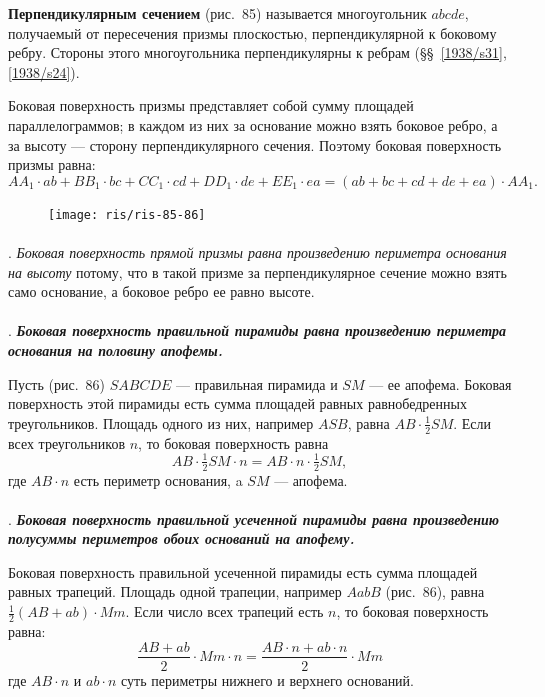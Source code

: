 \documentclass[twoside]{book}
\begin{document}
\textbf{Перпендикулярным сечением} (рис.~85) называется многоугольник $abcde$, получаемый от пересечения призмы плоскостью, перпендикулярной к боковому ребру.
Стороны этого многоугольника перпендикулярны к ребрам (§§~\ref{1938/s31}, \ref{1938/s24}). %

Боковая поверхность призмы представляет собой сумму площадей параллелограммов;
в каждом из них за основание можно взять боковое ребро, а за высоту --- сторону перпендикулярного сечения.
Поэтому боковая поверхность призмы равна:
\[AA_1\cdot ab+ BB_1\cdot bc+CC_1\cdot cd+DD_1\cdot de+EE_1\cdot ea
=
(ab+ bc+ cd+ de+ ea)\cdot AA_1.\]

\begin{figure}[h!]
\centering
\texttt{[image: ris/ris-85-86]}
\caption{}
\end{figure}

\paragraph{}\label{1938/s79}
.
\emph{Боковая поверхность прямой призмы равна произведению периметра основания на высоту} потому, что в такой призме за перпендикулярное сечение можно взять само основание, а боковое ребро ее равно высоте.

\paragraph{}\label{1938/s80}
.
\textbf{\emph{Боковая поверхность правильной пирамиды равна произведению периметра основания на половину апофемы.}}

Пусть (рис.~86) $SABCDE$ --- правильная пирамида и $SM$ --- ее апофема.
Боковая поверхность этой пирамиды есть сумма площадей равных равнобедренных треугольников.
Площадь одного из них, например $ASB$, равна $AB\cdot\tfrac12SM$.
Если всех треугольников $n$, то боковая поверхность равна %
\[AB\cdot\tfrac12SM\cdot n= AB\cdot n\cdot\tfrac12SM,\]
где $AB\cdot n$ есть периметр основания, a $SM$ --- апофема.

\paragraph{}\label{1938/s81}
.
\textbf{\emph{Боковая поверхность правильной усеченной пирамиды равна произведению полусуммы периметров обоих оснований на апофему.}}

Боковая поверхность правильной усеченной пирамиды есть сумма площадей равных трапеций.
Площадь одной трапеции, например $AabB$ (рис.~86), равна $\tfrac12(AB + ab)\cdot Mm$.
Если число всех трапеций есть $n$, то боковая поверхность равна:
\[\frac{AB+ab}{2}\cdot Mm\cdot n=\frac{AB\cdot n+ab\cdot n}{2}\cdot Mm\]
где $AB\cdot n$ и $ab\cdot n$ суть периметры нижнего и верхнего оснований. %
\end{document}
